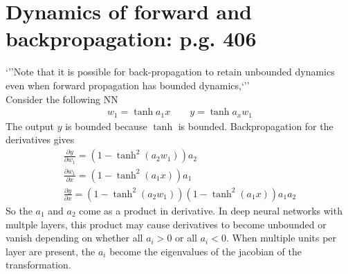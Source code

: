 \documentclass{article}
\newcommand{\ber}{\begin{eqnarray}}
\newcommand{\eer}{\end{eqnarray}}
\newcommand{\pdd}[2]{\frac{\partial{#1}}{\partial{#2}}}
\begin{document}
\section{Dynamics of forward and backpropagation: p.g. 406}
`''Note that it is possible for back-propagation to retain unbounded dynamics even when forward propagation has bounded dynamics,`''\\
Consider the following NN
\ber
w_1 = \tanh{a_1x} \qquad y = \tanh{a_xw_1}
\eer
The output $y$ is bounded because $\tanh$ is bounded. Backpropagation for the derivatives gives
\ber
\pdd{y}{w_1} = (1-\tanh^2{(a_2w_1)})a_2\\
\pdd{w_1}{x} = (1-\tanh^2{(a_1x)})a_1\\
\pdd{y}{x} = (1-\tanh^2{(a_2w_1)})(1-\tanh^2{(a_1x)})a_1a_2
\eer
So the $a_1$ and $a_2$ come as a product in derivative. In deep neural networks with multple layers, this product may cause derivatives to become unbounded or vanish depending on whether all $a_i>0$ or all $a_i<0$. When multiple units per layer are present, the $a_i$ become the eigenvalues of the jacobian of the transformation. 
%
%
%
\end{document}
